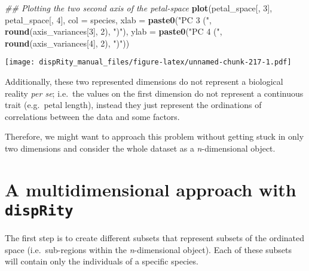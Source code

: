 \documentclass[
]{book}
\newenvironment{Shaded}{\begin{snugshade}}{\end{snugshade}}
\newcommand{\CommentTok}[1]{\textcolor[rgb]{0.56,0.35,0.01}{\textit{#1}}}
\newcommand{\DataTypeTok}[1]{\textcolor[rgb]{0.13,0.29,0.53}{#1}}
\newcommand{\DecValTok}[1]{\textcolor[rgb]{0.00,0.00,0.81}{#1}}
\newcommand{\KeywordTok}[1]{\textcolor[rgb]{0.13,0.29,0.53}{\textbf{#1}}}
\newcommand{\NormalTok}[1]{#1}
\newcommand{\StringTok}[1]{\textcolor[rgb]{0.31,0.60,0.02}{#1}}
\begin{document}
\begin{Shaded}
\begin{Highlighting}[]
\CommentTok{\#\# Plotting the two second axis of the petal{-}space}
\KeywordTok{plot}\NormalTok{(petal\_space[, }\DecValTok{3}\NormalTok{], petal\_space[, }\DecValTok{4}\NormalTok{], }\DataTypeTok{col =}\NormalTok{ species,}
    \DataTypeTok{xlab =} \KeywordTok{paste0}\NormalTok{(}\StringTok{"PC 3 ("}\NormalTok{, }\KeywordTok{round}\NormalTok{(axis\_variances[}\DecValTok{3}\NormalTok{], }\DecValTok{2}\NormalTok{), }\StringTok{")"}\NormalTok{),}
    \DataTypeTok{ylab =} \KeywordTok{paste0}\NormalTok{(}\StringTok{"PC 4 ("}\NormalTok{, }\KeywordTok{round}\NormalTok{(axis\_variances[}\DecValTok{4}\NormalTok{], }\DecValTok{2}\NormalTok{), }\StringTok{")"}\NormalTok{))}
\end{Highlighting}
\end{Shaded}

\texttt{[image: dispRity\_manual\_files/figure-latex/unnamed-chunk-217-1.pdf]}

Additionally, these two represented dimensions do not represent a biological reality \emph{per se}; i.e.~the values on the first dimension do not represent a continuous trait (e.g.~petal length), instead they just represent the ordinations of correlations between the data and some factors.

Therefore, we might want to approach this problem without getting stuck in only two dimensions and consider the whole dataset as a \emph{n}-dimensional object.

\hypertarget{a-multidimensional-approach-with-disprity}{%
\section{\texorpdfstring{A multidimensional approach with \texttt{dispRity}}{A multidimensional approach with dispRity}}\label{a-multidimensional-approach-with-disprity}}

The first step is to create different subsets that represent subsets of the ordinated space (i.e.~sub-regions within the \emph{n}-dimensional object).
Each of these subsets will contain only the individuals of a specific species.
\end{document}

